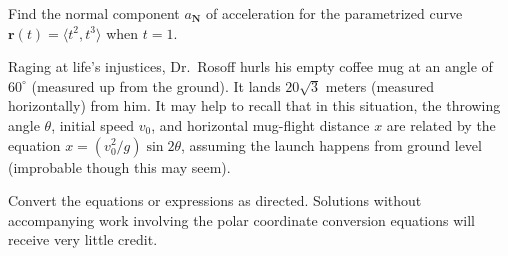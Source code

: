 \documentclass[11pt]{exam}
\newcommand{\dwrspace}[1]{\vspace*{\stretch{#1}}}
\renewcommand{\vec}[1]{\mathbf{#1}}
\begin{document}
\begin{questions}
\begin{parts}
    \dwrspace{3}

    \bonuspart[4] Find the normal component $a_{\vec{N}}$ of acceleration for the parametrized curve $\vec{r}(t) = \langle t^2 , t^3 \rangle$ when $t = 1$.

    \end{parts}

\dwrspace{2}

\newpage

\question Raging at life's injustices, Dr.\ Rosoff hurls his empty coffee mug at an angle of $60^{\circ}$ (measured up from the ground). It lands $20 \sqrt{3}$ meters (measured horizontally) from him. It may help to recall that in this situation, the throwing angle $\theta$, initial speed $v_0$, and horizontal mug-flight distance $x$ are related by the equation $x = (v_0^2/g) \sin 2\theta$, assuming the launch happens from ground level (improbable though this may seem). 


\newpage

\question Convert the equations or expressions as directed. Solutions without accompanying work involving the polar coordinate conversion equations will receive very little credit.


\end{questions}
\end{document}
